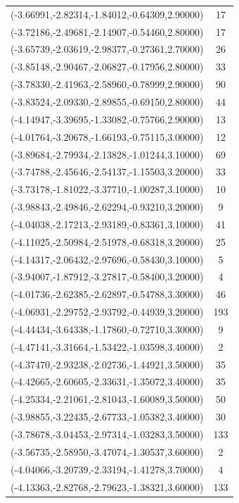 \documentclass[12pt, fullpage,letterpaper]{article}
\begin{document}
\begin{longtable}{c|c}
(-3.66991,-2.82314,-1.84012,-0.64309,2.90000) & 17 \\
(-3.72186,-2.49681,-2.14907,-0.54460,2.80000) & 17 \\
(-3.65739,-2.03619,-2.98377,-0.27361,2.70000) & 26 \\
(-3.85148,-2.90467,-2.06827,-0.17956,2.80000) & 33 \\
(-3.78330,-2.41963,-2.58960,-0.78999,2.90000) & 90 \\
(-3.83524,-2.09330,-2.89855,-0.69150,2.80000) & 44 \\
(-4.14947,-3.39695,-1.33082,-0.75766,2.90000) & 13 \\
(-4.01764,-3.20678,-1.66193,-0.75115,3.00000) & 12 \\
(-3.89684,-2.79934,-2.13828,-1.01244,3.10000) & 69 \\
(-3.74788,-2.45646,-2.54137,-1.15503,3.20000) & 33 \\
(-3.73178,-1.81022,-3.37710,-1.00287,3.10000) & 10 \\
(-3.98843,-2.49846,-2.62294,-0.93210,3.20000) & 9 \\
(-4.04038,-2.17213,-2.93189,-0.83361,3.10000) & 41 \\
(-4.11025,-2.50984,-2.51978,-0.68318,3.20000) & 25 \\
(-4.14317,-2.06432,-2.97696,-0.58430,3.10000) & 5 \\
(-3.94007,-1.87912,-3.27817,-0.58400,3.20000) & 4 \\
(-4.01736,-2.62385,-2.62897,-0.54788,3.30000) & 46 \\
(-4.06931,-2.29752,-2.93792,-0.44939,3.20000) & 193 \\
(-4.44434,-3.64338,-1.17860,-0.72710,3.30000) & 9 \\
(-4.47141,-3.31664,-1.53422,-1.03598,3.40000) & 2 \\
(-4.37470,-2.93238,-2.02736,-1.44921,3.50000) & 35 \\
(-4.42665,-2.60605,-2.33631,-1.35072,3.40000) & 35 \\
(-4.25334,-2.21061,-2.81043,-1.60089,3.50000) & 50 \\
(-3.98855,-3.22435,-2.67733,-1.05382,3.40000) & 30 \\
(-3.78678,-3.04453,-2.97314,-1.03283,3.50000) & 133 \\
(-3.56735,-2.58950,-3.47074,-1.30537,3.60000) & 2 \\
(-4.04066,-3.20739,-2.33194,-1.41278,3.70000) & 4 \\
(-4.13363,-2.82768,-2.79623,-1.38321,3.60000) & 133 \\

\end{longtable}
\end{document}

